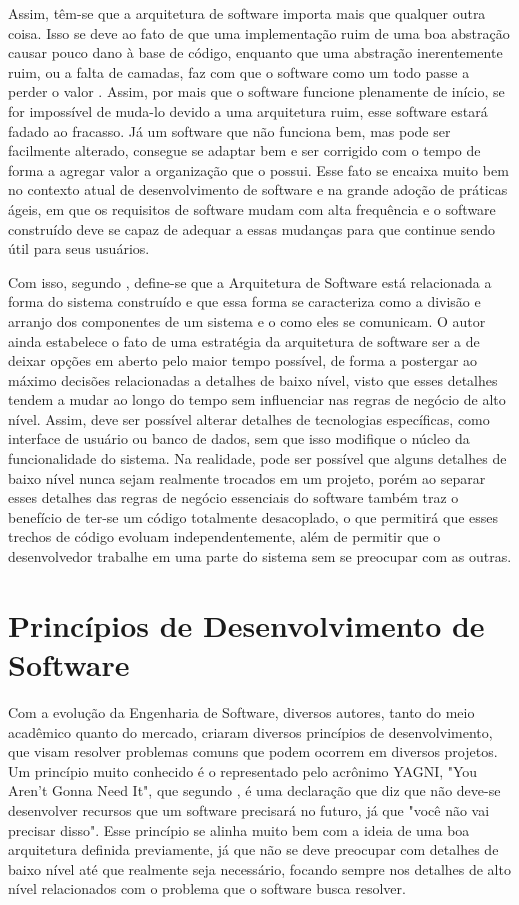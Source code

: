 \documentclass[12pt, %
openright, 
oneside, %
a4paper,    %
brazil]{facom-ufu-abntex2}
\begin{document}
Assim, têm-se que a arquitetura de software importa mais que qualquer outra coisa. Isso se deve ao fato de que uma implementação ruim de uma boa abstração causar pouco dano à base de código, enquanto que uma abstração inerentemente ruim, ou a falta de camadas, faz com que o software como um todo passe a perder o valor \cite{KIEHL}. Assim, por mais que o software funcione plenamente de início, se for impossível de muda-lo devido a uma arquitetura ruim, esse software estará fadado ao fracasso. Já um software que não funciona bem, mas pode ser facilmente alterado, consegue se adaptar bem e ser corrigido com o tempo de forma a agregar valor a organização que o possui. Esse fato se encaixa muito bem no contexto atual de desenvolvimento de software e na grande adoção de práticas ágeis, em que os requisitos de software mudam com alta frequência e o software construído deve se capaz de adequar a essas mudanças para que continue sendo útil para seus usuários.

Com isso, segundo , define-se que a Arquitetura de Software está relacionada a forma do sistema construído e que essa forma se caracteriza como a divisão e arranjo dos componentes de um sistema e o como eles se comunicam. O autor ainda estabelece o fato de uma estratégia da arquitetura de software ser a de deixar opções em aberto pelo maior tempo possível, de forma a postergar ao máximo decisões relacionadas a detalhes de baixo nível, visto que esses detalhes tendem a mudar ao longo do tempo sem influenciar nas regras de negócio de alto nível. Assim, deve ser possível alterar detalhes de tecnologias específicas, como interface de usuário ou banco de dados, sem que isso modifique o núcleo da funcionalidade do sistema. Na realidade, pode ser possível que alguns detalhes de baixo nível nunca sejam realmente trocados em um projeto, porém ao separar esses detalhes das regras de negócio essenciais do software também traz o benefício de ter-se um código totalmente desacoplado, o que permitirá que esses trechos de código evoluam independentemente, além de permitir que o desenvolvedor trabalhe em uma parte do sistema sem se preocupar com as outras.

\section{Princípios de Desenvolvimento de Software}
Com a evolução da Engenharia de Software, diversos autores, tanto do meio acadêmico quanto do mercado, criaram diversos princípios de desenvolvimento, que visam resolver problemas comuns que podem ocorrem em diversos projetos. Um princípio muito conhecido é o representado pelo acrônimo YAGNI, "You Aren't Gonna Need It", que segundo , é uma declaração que diz que não deve-se desenvolver recursos que um software precisará no futuro, já que "você não vai precisar disso". Esse princípio se alinha muito bem com a ideia de uma boa arquitetura definida previamente, já que não se deve preocupar com detalhes de baixo nível até que realmente seja necessário, focando sempre nos detalhes de alto nível relacionados com o problema que o software busca resolver.
\end{document}

